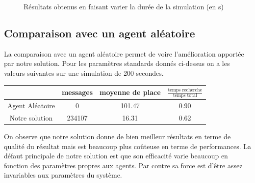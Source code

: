 \begin{figure}
\begin{center}
  \end{center}

  \caption{Résultats obtenus en faisant varier la durée de la simulation (en s)}
  \label{timesim:all}
\end{figure}

\subsection{Comparaison avec un agent aléatoire}

La comparaison avec un agent aléatoire permet de voire l'amélioration apportée par notre solution.
Pour les paramètres standards donnés ci-dessus on a les valeurs suivantes sur une simulation de 200 secondes.

\begin{center}
  \begin{tabular}{c|c|c|c}
    & messages      & moyenne de place & $\frac{\mbox{temps recherche}}{\mbox{temps total}}$\\
    \hline
    Agent Aléatoire & 0        & 101.47                            & 0.90\\
    \hline
    Notre solution  & 234107   & 16.31                             & 0.62\\
  \end{tabular}
\end{center}

On observe que notre solution donne de bien meilleur résultats en terme de qualité du résultat mais est beaucoup plus coûteuse en terme de performances. La défaut principale de notre solution est que son efficacité varie beaucoup en fonction des paramètres propres aux agents. Par contre sa force est d'être assez invariables aux paramètres du système.

